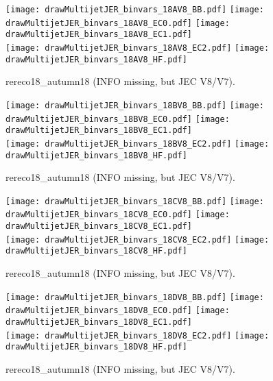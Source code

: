 \documentclass[landscape,10pt]{beamer} %
\begin{document}
{{\newpage

\begin{figure}[p]
\centering
  \texttt{[image: drawMultijetJER\_binvars\_18AV8\_BB.pdf]}
  \texttt{[image: drawMultijetJER\_binvars\_18AV8\_EC0.pdf]}
  \texttt{[image: drawMultijetJER\_binvars\_18AV8\_EC1.pdf]}\\
  \texttt{[image: drawMultijetJER\_binvars\_18AV8\_EC2.pdf]}
  \texttt{[image: drawMultijetJER\_binvars\_18AV8\_HF.pdf]}
\caption{rereco18\_autumn18 (INFO missing, but JEC V8/V7).}
\end{figure}

\newpage

\begin{figure}[p]
\centering
  \texttt{[image: drawMultijetJER\_binvars\_18BV8\_BB.pdf]}
  \texttt{[image: drawMultijetJER\_binvars\_18BV8\_EC0.pdf]}
  \texttt{[image: drawMultijetJER\_binvars\_18BV8\_EC1.pdf]}\\
  \texttt{[image: drawMultijetJER\_binvars\_18BV8\_EC2.pdf]}
  \texttt{[image: drawMultijetJER\_binvars\_18BV8\_HF.pdf]}
\caption{rereco18\_autumn18 (INFO missing, but JEC V8/V7).}
\end{figure}

\newpage

\begin{figure}[p]
\centering
  \texttt{[image: drawMultijetJER\_binvars\_18CV8\_BB.pdf]}
  \texttt{[image: drawMultijetJER\_binvars\_18CV8\_EC0.pdf]}
  \texttt{[image: drawMultijetJER\_binvars\_18CV8\_EC1.pdf]}\\
  \texttt{[image: drawMultijetJER\_binvars\_18CV8\_EC2.pdf]}
  \texttt{[image: drawMultijetJER\_binvars\_18CV8\_HF.pdf]}
\caption{rereco18\_autumn18 (INFO missing, but JEC V8/V7).}
\end{figure}

\newpage

\begin{figure}[p]
\centering
  \texttt{[image: drawMultijetJER\_binvars\_18DV8\_BB.pdf]}
  \texttt{[image: drawMultijetJER\_binvars\_18DV8\_EC0.pdf]}
  \texttt{[image: drawMultijetJER\_binvars\_18DV8\_EC1.pdf]}\\
  \texttt{[image: drawMultijetJER\_binvars\_18DV8\_EC2.pdf]}
  \texttt{[image: drawMultijetJER\_binvars\_18DV8\_HF.pdf]}
\caption{rereco18\_autumn18 (INFO missing, but JEC V8/V7).}
\end{figure}

}}
\end{document}
